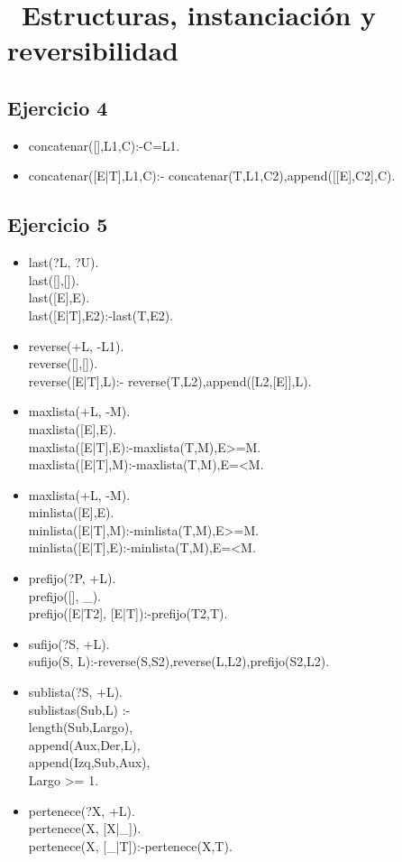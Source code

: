 \documentclass[10pt,a4paper]{article}
\begin{document}
\section*{\ Estructuras, instanciación y reversibilidad}

\subsection{Ejercicio 4}
\begin{itemize}
\item concatenar([],L1,C):-C=L1.
\item concatenar([E|T],L1,C):- concatenar(T,L1,C2),append([[E],C2],C).
\end{itemize}

\subsection{Ejercicio 5}
\begin{itemize}
\item last(?L, ?U). \\
last([],[]). \\
last([E],E). \\
last([E|T],E2):-last(T,E2).
\item reverse(+L, -L1). \\
reverse([],[]). \\
reverse([E|T],L):- reverse(T,L2),append([L2,[E]],L).
\item maxlista(+L, -M). \\
maxlista([E],E). \\
maxlista([E|T],E):-maxlista(T,M),E>=M. \\
maxlista([E|T],M):-maxlista(T,M),E=<M.
\item maxlista(+L, -M).\\
minlista([E],E). \\
minlista([E|T],M):-minlista(T,M),E>=M. \\
minlista([E|T],E):-minlista(T,M),E=<M.
\item prefijo(?P, +L). \\
prefijo([], _). \\
prefijo([E|T2], [E|T]):-prefijo(T2,T).
\item sufijo(?S, +L). \\
sufijo(S, L):-reverse(S,S2),reverse(L,L2),prefijo(S2,L2).
\item sublista(?S, +L). \\
sublistas(Sub,L) :- \\
length(Sub,Largo), \\
append(Aux,Der,L), \\
append(Izq,Sub,Aux), \\
Largo >= 1.
\item pertenece(?X, +L). \\
pertenece(X, [X|_]). \\
pertenece(X, [_|T]):-pertenece(X,T).
\end{itemize}
\end{document}
